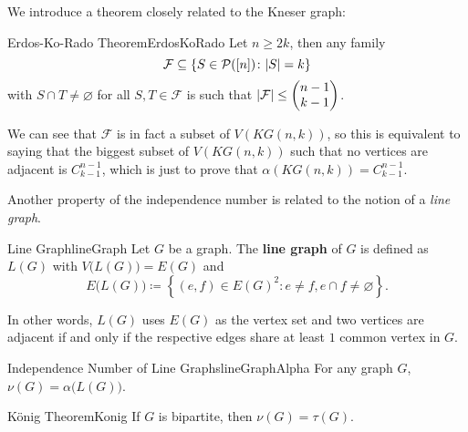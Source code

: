 \documentclass[math, code]{amznotes}
\theoremstyle{remark}
\begin{document}
We introduce a theorem closely related to the Kneser graph:
\begin{thmbox}{Erdos-Ko-Rado Theorem}{ErdosKoRado}
    Let $n \geq 2k$, then any family
    \begin{equation*}
        \mathcal{F} \subseteq \left\{S \in \mathcal{P}([n]) \colon {\left\lvert {S} \right\rvert} = k\right\}
    \end{equation*}
    with $S \cap T \neq \varnothing$ for all $S, T \in \mathcal{F}$ is such that ${\left\lvert {\mathcal{F}} \right\rvert} \leq \begin{pmatrix}
        n - 1 \\
        k - 1
    \end{pmatrix}$.
\end{thmbox}
We can see that $\mathcal{F}$ is in fact a subset of $V(KG(n, k))$, so this is equivalent to saying that the biggest subset of $V(KG(n, k))$ such that no vertices are adjacent is $C^{n - 1}_{k - 1}$, which is just to prove that $\alpha(KG(n, k)) = C^{n - 1}_{k - 1}$.

Another property of the independence number is related to the notion of a \textit{line graph}.
\begin{dfnbox}{Line Graph}{lineGraph}
    Let $G$ be a graph. The {\color{red} \textbf{line graph}} of $G$ is defined as $L(G)$ with $V\bigl(L(G)\bigr) = E(G)$ and
    \begin{equation*}
        E\bigl(L(G)\bigr) \coloneqq \left\{(e, f) \in E(G)^2 \colon e \neq f, e \cap f \neq \varnothing\right\}.
    \end{equation*}
\end{dfnbox}
In other words, $L(G)$ uses $E(G)$ as the vertex set and two vertices are adjacent if and only if the respective edges share at least $1$ common vertex in $G$.
\begin{probox}{Independence Number of Line Graphs}{lineGraphAlpha}
    For any graph $G$, $\nu(G) = \alpha\bigl(L(G)\bigr)$.
\end{probox}
\begin{thmbox}{K\"{o}nig Theorem}{Konig}
    If $G$ is bipartite, then $\nu(G) = \tau(G)$.
\end{thmbox}
\end{document}
